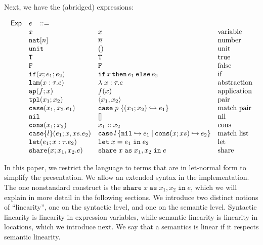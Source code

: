 \documentclass{easychair}
\newcommand{\ms}[1]{\ensuremath{\mathsf{#1}}}
\newcommand{\irl}[1]{\mathtt{#1}}
\newcommand{\paircaseabt}[4]{\irl{case}(#2,#3.#4)}
\newcommand{\paircasecst}[4]{\irl{case} \; #1\; \{(#2;#3) \hookrightarrow #4\}}
\newcommand{\sharecst}[4]{\irl{share}\;#1\;\irl{as}\;#2,#3\;\irl{in}\;#4}
\newcommand{\shareabt}[4]{\irl{share}(#1;#2,#3.#4)}
\theoremstyle{definition}
\begin{document}
Next, we have the (abridged) expressions: 

\[
\begin{array}{r l l l l}
\ms{Exp}
        & e   \,\,\,\,\, ::= \\
 	& x                                			& x 												& \text{variable}\\
  & \irl{nat}[n]							& \numeral{n}												& \text{number}\\
  & \irl{unit}							& ()												& \text{unit}\\
  & \irl{T}							& \irl{T}												& \text{true}\\
  & \irl{F}	   					& \irl{F}												& \text{false}\\
  & \ifexabt{x}{e_1}{e_2} & \ifexcst{x}{e_1}{e_2}  & \text{if}\\
  & \irl{lam}(x:\tau.e) 						&\lambda \; x : \tau. e 		& \text{abstraction}\\
  & \irl{ap}(f;x) 					& \appcst{f}{x} 										& \text{application}\\
  & \irl{tpl}(x_1;x_2)     	& \pairexcst{x_1}{x_2}                									& \text{pair}\\
 	& \paircaseabt{p}{x_1}{x_2}{e_1}					& \paircasecst{p}{x_1}{x_2}{e_1}   	& \text{match pair}\\
 	& \nilexabt					& []   										& \text{nil}\\
 	& \consexabt{x_1}{x_2}					& x_1::x_2   										& \text{cons}\\
 	& \listcaseexabt{l}{e_1}{x}{xs}{e_2}					& \listcaseexcst{l}{e_1}{x}{xs}{e_2}   	& \text{match list}\\
  & \irl{let}(e_1; x : \tau.e_2)			& \irl{let}\; x = e_1 \; \irl{in}\; e_2   	& \text{let}\\
  & \shareabt{x}{x_1}{x_2}{e} &\sharecst{x}{x_1}{x_2}{e} &\text{share}
\end{array}
\]

In this paper, we restrict the language to terms that are in let-normal form to simplify the presentation. We allow an extended syntax in the implementation. 
The one nonstandard construct is the $\sharecst{x}{x_1}{x_2}{e}$, which we will explain in more 
detail in the following sections. We introduce two distinct notions of ``linearity'', one on 
the syntactic level, and one on the semantic level. Syntactic linearity is linearity in 
expression variables, while semantic linearity is linearity in locations, which we introduce next.
We say that a semantics is linear if it respects semantic linearity.
\end{document}
